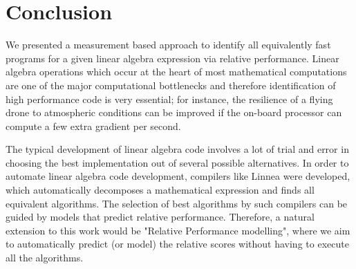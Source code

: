 \documentclass[conference]{IEEEtran}
\begin{document}
\section{Conclusion}
\label{sec:con}
We presented a measurement based approach to identify all equivalently fast programs for a given linear algebra expression via relative performance. Linear algebra operations which occur at the heart of most mathematical computations are one of the major computational bottlenecks and therefore identification of high performance code is very essential; for instance, the resilience of a flying drone to atmospheric conditions can be improved if the on-board processor can compute a few extra gradient per second. 

The typical development of linear algebra code involves a lot of trial and error in choosing the best implementation out of several possible alternatives. In order to automate linear algebra code development, compilers like Linnea\cite{barthels2019linnea} were developed, which automatically decomposes a mathematical expression and finds all equivalent algorithms.  The selection of best algorithms by such compilers can be guided by models that predict relative performance. Therefore, a natural extension to this work would be "Relative Performance modelling", where we aim to automatically predict (or model) the relative scores without having to execute all the algorithms.



\end{document}
